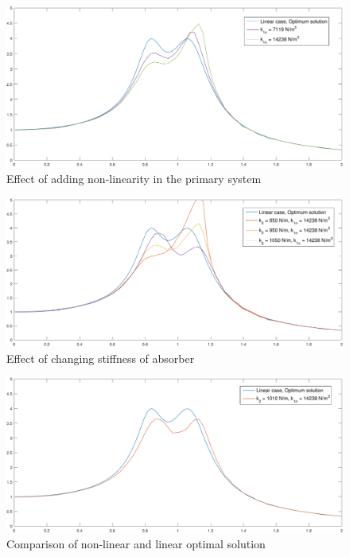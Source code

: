 \begin{figure}[h!]
\includegraphics[width=\textwidth, height = 0.5\textwidth]{"figures/addingNonlinearity"}
\caption{Effect of adding non-linearity in the primary system}
\end{figure}

\begin{figure}[h!]
\includegraphics[width=\textwidth, height = 0.5\textwidth]{"figures/changingk2"}
\caption{Effect of changing stiffness of absorber}
\end{figure}

\begin{figure}[h!]
\includegraphics[width=\textwidth, height = 0.5\textwidth]{"figures/comparing"}
\caption{Comparison of non-linear and linear optimal solution}
\end{figure}

